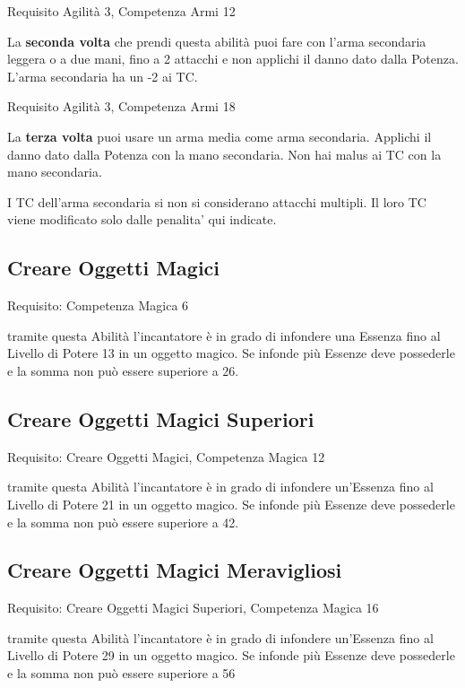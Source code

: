 \documentclass[a4paper,11pt,twoside,openany]{book}
\begin{document}
Requisito Agilità 3, Competenza Armi 12

La \textbf{seconda volta} che prendi questa abilità puoi fare con l'arma secondaria leggera o a due mani, fino a 2 attacchi e non applichi il danno dato dalla Potenza. L'arma secondaria ha un -2 ai TC.

Requisito Agilità 3, Competenza Armi 18

La \textbf{terza volta} puoi usare un arma media come arma secondaria. Applichi il danno dato dalla Potenza con la mano secondaria. Non hai malus ai TC con la mano secondaria.

I TC dell'arma secondaria si non si considerano attacchi multipli. Il loro TC viene modificato solo dalle penalita' qui indicate.

\subsection{Creare Oggetti Magici}

Requisito: Competenza Magica 6

tramite questa Abilità l'incantatore è in grado di infondere una Essenza fino al Livello di Potere 13 in un oggetto magico. Se infonde più Essenze deve possederle e la somma non può essere superiore a 26.

\subsection{Creare Oggetti Magici Superiori}

Requisito: Creare Oggetti Magici, Competenza Magica 12

tramite questa Abilità l'incantatore è in grado di infondere un'Essenza fino al Livello di Potere 21 in un oggetto magico. Se infonde più Essenze deve possederle e la somma non può essere superiore a 42.

\subsection{Creare Oggetti Magici Meravigliosi}

Requisito: Creare Oggetti Magici Superiori, Competenza Magica 16

tramite questa Abilità l'incantatore è in grado di infondere un'Essenza fino al Livello di Potere 29 in un oggetto magico. Se infonde più Essenze deve possederle e la somma non può essere superiore a 56
\end{document}
